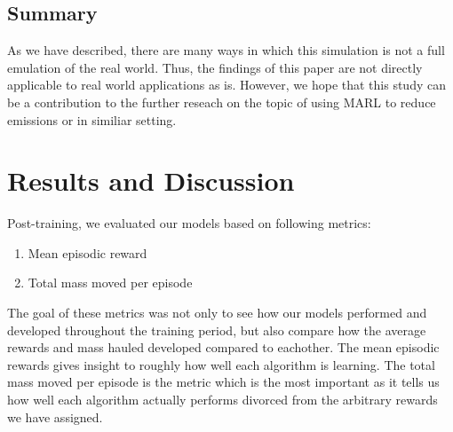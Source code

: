 \documentclass[conference]{IEEEtran}
\begin{document}
\subsection{Summary}
As we have described, there are many ways in which this simulation is not a full emulation of the
real world. Thus, the findings of this paper are not directly applicable to real world applications
as is. However, we hope that this study can be a contribution to the further reseach on the topic of
using MARL to reduce emissions or in similiar setting.


\section{Results and Discussion}
Post-training, we evaluated our models based on following metrics:

\begin{enumerate}
	\item Mean episodic reward
	\item Total mass moved per episode
\end{enumerate}

The goal of these metrics was not only to see how our models performed and developed throughout the training period, but also compare how the average rewards and mass hauled developed compared to eachother.
The mean episodic rewards gives insight to roughly how well each algorithm is learning.
The total mass moved per episode is the metric which is the most important as it tells us how well each algorithm actually performs divorced from the arbitrary rewards we have assigned.
\end{document}

